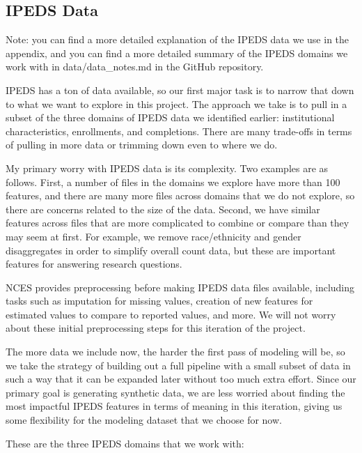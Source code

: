 \documentclass[sigconf, authorversion, nonacm]{acmart}
\begin{document}
    \subsection{IPEDS Data}

        Note: you can find a more detailed explanation of the IPEDS data we use in the appendix, and you can find a more detailed summary of the IPEDS domains we work with in data/data\_notes.md in the GitHub repository.

        IPEDS has a ton of data available, so our first major task is to narrow that down to what we want to explore in this project. The approach we take is to pull in a subset of the three domains of IPEDS data we identified earlier: institutional characteristics, enrollments, and completions. There are many trade-offs in terms of pulling in more data or trimming down even to where we do.

        My primary worry with IPEDS data is its complexity. Two examples are as follows. First, a number of files in the domains we explore have more than 100 features, and there are many more files across domains that we do not explore, so there are concerns related to the size of the data. Second, we have similar features across files that are more complicated to combine or compare than they may seem at first. For example, we remove race/ethnicity and gender disaggregates in order to simplify overall count data, but these are important features for answering research questions.

        NCES provides preprocessing before making IPEDS data files available, including tasks such as imputation for missing values, creation of new features for estimated values to compare to reported values, and more. We will not worry about these initial preprocessing steps for this iteration of the project.

        The more data we include now, the harder the first pass of modeling will be, so we take the strategy of building out a full pipeline with a small subset of data in such a way that it can be expanded later without too much extra effort. Since our primary goal is generating synthetic data, we are less worried about finding the most impactful IPEDS features in terms of meaning in this iteration, giving us some flexibility for the modeling dataset that we choose for now.

        These are the three IPEDS domains that we work with:
\end{document}
